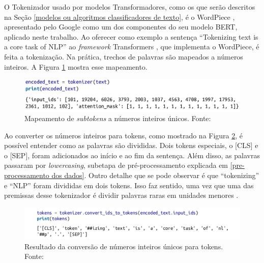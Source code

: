 O Tokenizador usado por modelos Transformadores, como os que serão descritos na Seção \ref{modelos ou algoritmos classificadores de texto}, é o WordPiece \cite{wordpiece1} \cite{wordpiece2}, apresentado pelo Google como um dos componentes do seu modelo BERT, aplicado neste trabalho. Ao oferecer como exemplo a sentença ``Tokenizing text is a core task of NLP'' ao \textit{framework} Transformers \cite{hf_transformers_paper}, que implementa o WordPiece, é feita a tokenização. Na prática, trechos de palavras são mapeados a números inteiros. A Figura \ref{fig:input_ids} mostra esse mapeamento.

\begin{figure}[htb]
        \centering
        \includegraphics[width=14cm]{figuras/input_ids.png}
        \caption{Mapeamento de \textit{subtokens} a números inteiros únicos. Fonte: \cite{transformers_book}}
        \label{fig:input_ids}
\end{figure}

Ao converter os números inteiros para tokens, como mostrado na Figura \ref{fig:tokens}, é possível entender como as palavras são divididas. Dois tokens especiais, o [CLS] e o [SEP], foram adicionados ao início e ao fim da sentença. Além disso, as palavras passaram por \textit{lowercasing}, subetapa de pré-processamento explicada em \ref{pre-processamento dos dados}. Outro detalhe que se pode observar é que ``tokenizing'' e ``NLP'' foram divididas em dois tokens. Isso faz sentido, uma vez que uma das premissas desse tokenizador é dividir palavras raras em unidades menores \cite{transformers_book}.

\begin{figure}[htb]
        \centering
        \includegraphics[width=14cm]{figuras/tokens.png}
        \caption{Resultado da conversão de números inteiros únicos para tokens. Fonte: \cite{transformers_book}}
        \label{fig:tokens}
\end{figure}

